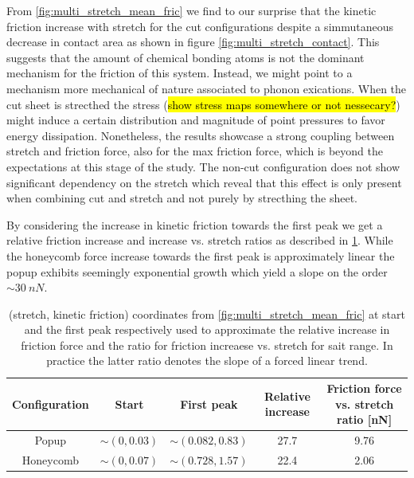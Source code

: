 From \cref{fig:multi_stretch_mean_fric} we find to our surprise that the
kinetic friction increase with stretch for the cut configurations despite a
simmutaneous decrease in contact area as shown in figure
\cref{fig:multi_stretch_contact}. This suggests that the amount of chemical
bonding atoms is not the dominant mechanism for the friction of this system.
Instead, we might point to a mechanism more mechanical of nature associated to
phonon exications. When the cut sheet is strecthed the stress (\hl{show stress
maps somewhere or not nessecary?}) might induce a certain distribution and
magnitude of point pressures to favor energy dissipation. Nonetheless, the
results showcase a strong coupling between stretch and friction force, also for
the max friction force, which is beyond the expectations at this stage of the
study. The non-cut configuration does not show significant dependency on the stretch which reveal that this effect is only present when combining cut and stretch and not purely by strecthing the sheet. 

By considering the increase in kinetic friction towards the first peak we get a relative friction increase and increase vs. stretch ratios as described in \cref{tab:first_peak_stretch}. While the honeycomb force increase towards the first peak is approximately linear the popup exhibits seemingly exponential growth which yield a slope on the order $\sim \SI{30}{nN}$. 

\begin{table}[H]
  \begin{center}
  \caption{(stretch, kinetic friction) coordinates from \cref{fig:multi_stretch_mean_fric} at start and the first peak respectively used to approximate the relative increase in friction force and the ratio for friction increaese vs. stretch for sait range. In practice  the latter ratio denotes the slope of a forced linear trend. }
  \label{tab:first_peak_stretch}
  \begin{tabular}{ | c | c | c | c | c |} \hline
  Configuration & Start & First peak & Relative increase & Friction force vs. stretch ratio [nN]  \\ \hline
  Popup & $\sim (0, 0.03)$ & $\sim(0.082, 0.83)$ & 27.7 & 9.76  \\ \hline
  Honeycomb & $\sim (0, 0.07)$ &  $\sim (0.728, 1.57)$ & 22.4 & 2.06 \\ \hline
  \end{tabular}
  \end{center}
\end{table}

